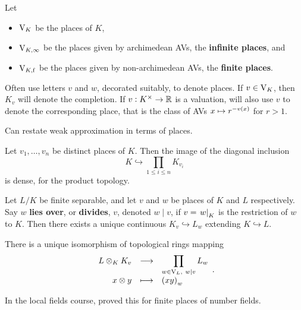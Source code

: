 \begin{notation*}
Let
\begin{itemize}
\item $ \mathrm{V}_K $ be the places of $ K $,
\item $ \mathrm{V}_{K, \infty} $ be the places given by archimedean AVs, the \textbf{infinite places}, and
\item $ \mathrm{V}_{K, \mathrm{f}} $ be the places given by non-archimedean AVs, the \textbf{finite places}.
\end{itemize}
Often use letters $ v $ and $ w $, decorated suitably, to denote places. If $ v \in \mathrm{V}_K $, then $ K_v $ will denote the completion. If $ v : K^\times \to \mathbb{R} $ is a valuation, will also use $ v $ to denote the corresponding place, that is the class of AVs $ x \mapsto r^{-v\br{x}} $ for $ r > 1 $.
\end{notation*}

Can restate weak approximation in terms of places.

\begin{proposition}
Let $ v_1, \dots, v_n $ be distinct places of $ K $. Then the image of the diagonal inclusion
$$ K \hookrightarrow \prod_{1 \le i \le n} K_{v_i} $$
is dense, for the product topology.
\end{proposition}

\pagebreak

Let $ L / K $ be finite separable, and let $ v $ and $ w $ be places of $ K $ and $ L $ respectively. Say $ w $ \textbf{lies over}, or \textbf{divides}, $ v $, denoted $ w \mid v $, if $ v = \left. w \right|_K $ is the restriction of $ w $ to $ K $. Then there exists a unique continuous $ K_v \hookrightarrow L_w $ extending $ K \hookrightarrow L $.

\begin{proposition}
There is a unique isomorphism of topological rings mapping
$$ \function{L \otimes_K K_v}{\prod_{w \in \V_L, \ w \mid v} L_w}{x \otimes y}{\br{xy}_w}. $$
\end{proposition}

In the local fields course, proved this for finite places of number fields.


